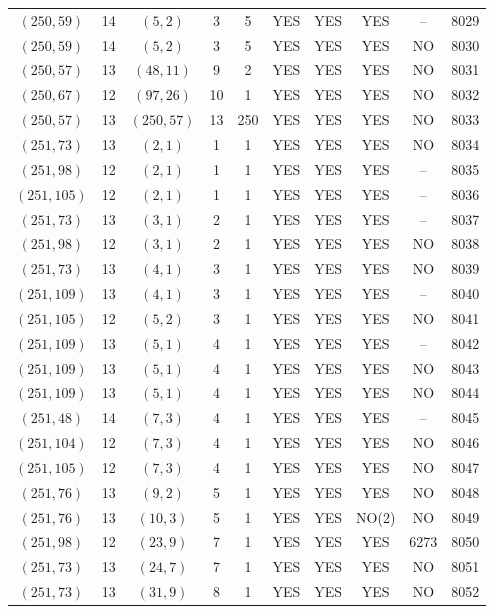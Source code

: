 \begin{longtable}{|c|c|c|c|c|c|c|c|c|c|}
$(250, 59)$ & 14 & $(5, 2)$ & 3 & 5 & YES & YES & YES & -- & 8029\\
$(250, 59)$ & 14 & $(5, 2)$ & 3 & 5 & YES & YES & YES & NO & 8030\\
$(250, 57)$ & 13 & $(48, 11)$ & 9 & 2 & YES & YES & YES & NO & 8031\\
$(250, 67)$ & 12 & $(97, 26)$ & 10 & 1 & YES & YES & YES & NO & 8032\\
$(250, 57)$ & 13 & $(250, 57)$ & 13 & 250 & YES & YES & YES & NO & 8033\\
$(251, 73)$ & 13 & $(2, 1)$ & 1 & 1 & YES & YES & YES & NO & 8034\\
$(251, 98)$ & 12 & $(2, 1)$ & 1 & 1 & YES & YES & YES & -- & 8035\\
$(251, 105)$ & 12 & $(2, 1)$ & 1 & 1 & YES & YES & YES & -- & 8036\\
$(251, 73)$ & 13 & $(3, 1)$ & 2 & 1 & YES & YES & YES & -- & 8037\\
$(251, 98)$ & 12 & $(3, 1)$ & 2 & 1 & YES & YES & YES & NO & 8038\\
$(251, 73)$ & 13 & $(4, 1)$ & 3 & 1 & YES & YES & YES & NO & 8039\\
$(251, 109)$ & 13 & $(4, 1)$ & 3 & 1 & YES & YES & YES & -- & 8040\\
$(251, 105)$ & 12 & $(5, 2)$ & 3 & 1 & YES & YES & YES & NO & 8041\\
$(251, 109)$ & 13 & $(5, 1)$ & 4 & 1 & YES & YES & YES & -- & 8042\\
$(251, 109)$ & 13 & $(5, 1)$ & 4 & 1 & YES & YES & YES & NO & 8043\\
$(251, 109)$ & 13 & $(5, 1)$ & 4 & 1 & YES & YES & YES & NO & 8044\\
$(251, 48)$ & 14 & $(7, 3)$ & 4 & 1 & YES & YES & YES & -- & 8045\\
$(251, 104)$ & 12 & $(7, 3)$ & 4 & 1 & YES & YES & YES & NO & 8046\\
$(251, 105)$ & 12 & $(7, 3)$ & 4 & 1 & YES & YES & YES & NO & 8047\\
$(251, 76)$ & 13 & $(9, 2)$ & 5 & 1 & YES & YES & YES & NO & 8048\\
$(251, 76)$ & 13 & $(10, 3)$ & 5 & 1 & YES & YES & NO(2) & NO & 8049\\
$(251, 98)$ & 12 & $(23, 9)$ & 7 & 1 & YES & YES & YES & 6273 & 8050\\
$(251, 73)$ & 13 & $(24, 7)$ & 7 & 1 & YES & YES & YES & NO & 8051\\
$(251, 73)$ & 13 & $(31, 9)$ & 8 & 1 & YES & YES & YES & NO & 8052\\

\end{longtable}
